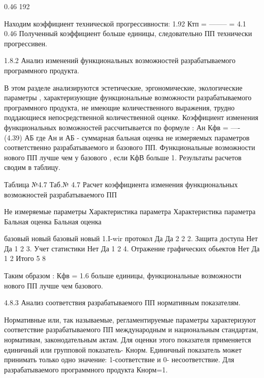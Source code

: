 \begin{ESKDexplanation}
\begin{ESKDexplanation}
\begin{ESKDexplanation}
\begin{ESKDexplanation}
0.46
192
               
Находим коэффициент технической прогрессивности:
                 1.92
 Ктп =    --------   =     4.1
                        0.46
Полученный коэффициент больше единицы, следовательно ПП технически
прогрессивен.

1.8.2  Анализ изменений функциональных возможностей разрабатываемого
              программного продукта.

В этом разделе анализируются  эстетические, эргономические,
экологические параметры , характеризующие функциональные возможности 
разрабатываемого программного продукта, не имеющие количественного 
выражения, трудно поддающиеся непосредственной количественной оценке.
Коэффициент изменения функциональных возможностей рассчитывается
по  формуле :
              Ан
 Кфв =  ----                                                                                                             (4.39)
                    АБ  
где  Ан  и  АБ   - суммарная бальная оценка не измеряемых параметров 
соответственно разрабатываемого и базового ПП.
Функциональные возможности нового ПП лучше чем у базового , если
КфВ  больше 1.
Результаты расчетов сводим в таблицу.


                                                                                                                 Таблица №4.7
Таб.№ 4.7  Расчет коэффициента изменения функциональных возможностей
                     разрабатываемого ПП

Не измеряемые параметры
Характеристика параметра
Характеристика параметра
Бальная оценка
Бальная оценка

базовый
новый
базовый
новый
1.I-wir протокол
Да
Да
2
2
2. Защита доступа
Нет
Да
1
2
3. Учет статистики
Нет
Да
1
2
4. Отражение графических обьектов
Нет
Да
1
2
                        Итого
5
8

Таким образом :      Кфв  =   1.6    больше единицы, функциональные возможности нового ПП лучше чем базового.

 4.8.3  Анализ соответствия разрабатываемого ПП нормативным показателям.
 
Нормативные или, так называемые, регламентируемые параметры характеризуют соответствие разрабатываемого ПП международным и национальным стандартам, нормативам, законодательным актам. Для оценки
этого показателя применяется единичный или групповой показатель- Кнорм.
Единичный показатель может принимать только одно значение: 1-соответствие и 0- несоответствие. Для разрабатываемого программного продукта Кнорм=1.


\end{ESKDexplanation}
\end{ESKDexplanation}
\end{ESKDexplanation}
\end{ESKDexplanation}
